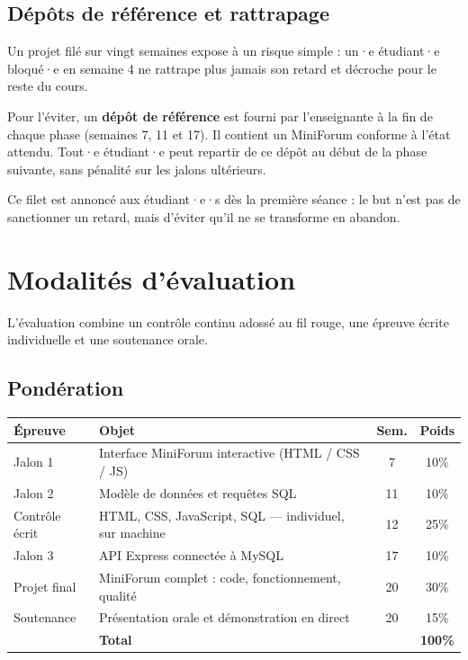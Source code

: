 \documentclass[a4paper,11pt]{article}
\begin{document}
\subsection{Dépôts de référence et rattrapage}

\begin{tcolorbox}[intro]
\small
Un projet filé sur vingt semaines expose à un risque simple : un·e étudiant·e bloqué·e en semaine 4 ne rattrape plus jamais son retard et décroche pour le reste du cours.

Pour l'éviter, un \textbf{dépôt de référence} est fourni par l'enseignante à la fin de chaque phase (semaines 7, 11 et 17). Il contient un MiniForum conforme à l'état attendu. Tout·e étudiant·e peut repartir de ce dépôt au début de la phase suivante, sans pénalité sur les jalons ultérieurs.

Ce filet est annoncé aux étudiant·e·s dès la première séance : le but n'est pas de sanctionner un retard, mais d'éviter qu'il ne se transforme en abandon.
\end{tcolorbox}

\newpage

\section{Modalités d'évaluation}

L'évaluation combine un contrôle continu adossé au fil rouge, une épreuve écrite individuelle et une soutenance orale.

\subsection{Pondération}

\begin{center}
\begin{tabularx}{\linewidth}{lXcc}
  \toprule
  \rowcolor{accentBlue}
  \color{white}\textbf{Épreuve} &
  \color{white}\textbf{Objet} &
  \color{white}\textbf{Sem.} &
  \color{white}\textbf{Poids} \\
  \midrule
  \rowcolor{cfptGrey}
  Jalon 1 & Interface MiniForum interactive (HTML / CSS / JS) & 7 & 10\% \\
  Jalon 2 & Modèle de données et requêtes SQL & 11 & 10\% \\
  \rowcolor{cfptGrey}
  Contrôle écrit & HTML, CSS, JavaScript, SQL --- individuel, sur machine & 12 & 25\% \\
  Jalon 3 & API Express connectée à MySQL & 17 & 10\% \\
  \rowcolor{cfptGrey}
  Projet final & MiniForum complet : code, fonctionnement, qualité & 20 & 30\% \\
  Soutenance & Présentation orale et démonstration en direct & 20 & 15\% \\
  \midrule
  \rowcolor{accentBlue!15}
  & \textbf{Total} & & \textbf{100\%} \\
  \bottomrule
\end{tabularx}
\end{center}
\end{document}

